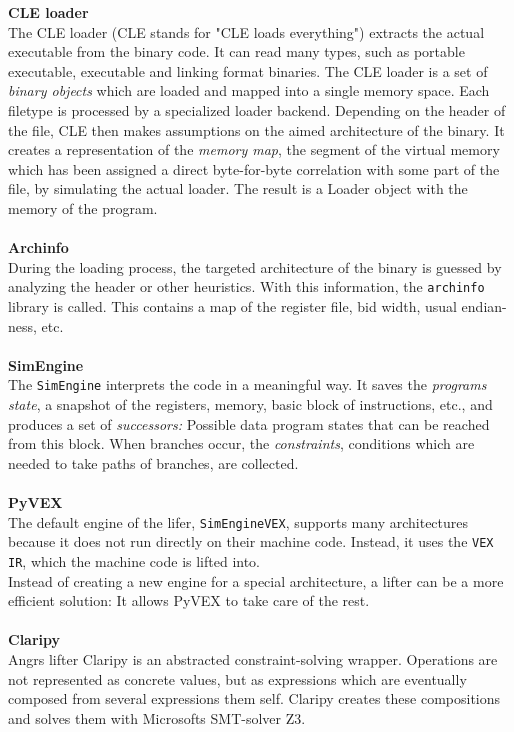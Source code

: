 \documentclass[seminar]{plai}
\begin{document}
\noindent\textbf{CLE loader}\\
The CLE loader (CLE stands for "CLE loads everything") extracts the actual executable from the binary code. It can read many types, such as portable executable, executable and linking format binaries. The CLE loader is a set of \textit{binary objects} which are loaded and mapped into a single memory space. Each filetype is processed by a specialized loader backend.\cite{loading-a-binary}
Depending on the header of the file, CLE then makes assumptions on the aimed architecture of the binary. It creates a representation of the \textit{memory map}, the segment of the virtual memory which has been assigned a direct byte-for-byte correlation with some part of the file, by simulating the actual loader. The result is a Loader object with the memory of the program.
\\\\
\textbf{Archinfo}\\
During the loading process, the targeted architecture of the binary is guessed by analyzing the header or other heuristics. With this information, the \texttt{archinfo} library is called. This contains a map of the register file, bid width, usual endian-ness, etc.
\\\\
\textbf{SimEngine}\\
The \texttt{SimEngine} interprets the code in a meaningful way. It saves the \textit{programs state}, a snapshot of the registers, memory, basic block of instructions, etc., and produces a set of \textit{successors:} Possible data program states that can be reached from this block.
When branches occur, the \textit{constraints}, conditions which are needed to take paths of branches, are collected.
\\\\
\textbf{PyVEX}\\
The default engine of the lifer, \texttt{SimEngineVEX}, supports many architectures because it does not run directly on their machine code. Instead, it uses the \texttt{VEX IR}, which the machine code is lifted into.\cite{angr-internals}\\
Instead of creating a new engine for a special architecture, a lifter can be a more efficient solution: It allows PyVEX to take care of the rest.\cite{art-of-war-angr}
\\\\
\textbf{Claripy}\\
Angrs lifter Claripy is an abstracted constraint-solving wrapper\cite{claripy-documentation}. Operations are not represented as concrete values, but as expressions which are eventually composed from several expressions them self. Claripy creates these compositions and solves them with Microsofts SMT-solver Z3.\cite{angr-internals}
\end{document}
